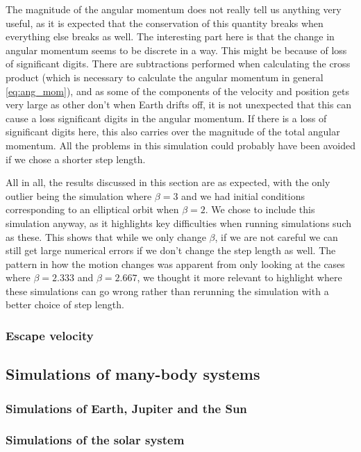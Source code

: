 \documentclass[reprint,english,notitlepage]{revtex4-1}  %
\begin{document}
The magnitude of the angular momentum does not really tell us anything very useful, as it is expected that the conservation of this quantity breaks when everything else breaks as well. The interesting part here is that the change in angular momentum seems to be discrete in a way. This might be because of loss of significant digits. There are subtractions performed when calculating the cross product (which is necessary to calculate the angular momentum in general \eqref{eq:ang_mom}), and as some of the components of the velocity and position gets very large as other don't when Earth drifts off, it is not unexpected that this can cause a loss significant digits in the angular momentum. If there is a loss of significant digits here, this also carries over the magnitude of the total angular momentum. All the problems in this simulation could probably have been avoided if we chose a shorter step length.

All in all, the results discussed in this section are as expected, with the only outlier being the simulation where $\beta = 3$ and we had initial conditions corresponding to an elliptical orbit when $\beta = 2$. We chose to include this simulation anyway, as it highlights key difficulties when running simulations such as these. This shows that while we only change $\beta$, if we are not careful we can still get large numerical errors if we don't change the step length as well. The pattern in how the motion changes was apparent from only looking at the cases where $\beta = 2.333$ and $\beta = 2.667$, we thought it more relevant to highlight where these simulations can go wrong rather than rerunning the simulation with a better choice of step length.

\subsubsection{Escape velocity} \label{sec:V:b:iv}


\subsection{Simulations of many-body systems} \label{sec:V:c}

\subsubsection{Simulations of Earth, Jupiter and the Sun} \label{sec:V:c:i}

\subsubsection{Simulations of the solar system} \label{sec:V:c:ii}
\end{document}
